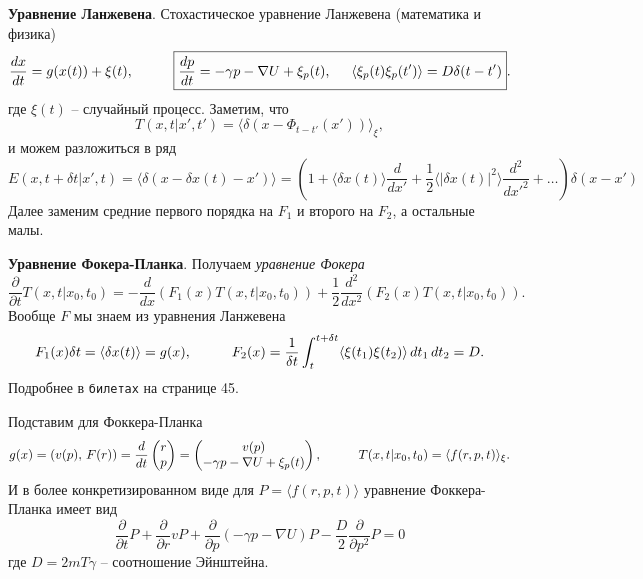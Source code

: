 \textbf{Уравнение Ланжевена}. Стохастическое уравнение Ланжевена (математика и физика)
\begin{equation}
	\frac{d x}{d t}  = g(x(t)) + \xi(t),
	\hspace{10 mm} 
	\boxed{
	\frac{d p}{d t} = -\gamma p - \nabla U + \xi_p(t),
	\hspace{5 mm} 
	\langle \xi_p (t) \xi_p (t')\rangle = D \delta(t-t')
	}.
\end{equation}
где $\xi(t)$ -- случайный процесс. Заметим, что
\begin{equation*}
	T(x, t|x',t') = \langle \delta(x-\Phi_{t-t'}(x'))\rangle_\xi,
\end{equation*}
и можем разложиться в ряд
\begin{equation*}
	E(x, t+ \delta t| x' , t) = \langle \delta(x-\delta x(t)-x')\rangle 
	= \left(
		1 + \langle \delta x(t)\rangle \frac{d }{d x'} + \frac{1}{2} \langle |\delta x(t)|^2\rangle \frac{d^2}{d {x'}^2}  + \ldots
	\right) \delta(x-x')
\end{equation*}
Далее заменим средние первого порядка на $F_1$ и второго на $F_2$, а остальные малы.

\textbf{Уравнение Фокера-Планка}. Получаем \textit{уравнение Фокера}
\begin{equation*}
	\frac{\partial }{\partial t} T(x, t|x_0, t_0) = - \frac{d }{d x} \left(
		F_1(x) T(x, t|x_0, t_0)
	\right) + \frac{1}{2} \frac{d^2}{d x^2} \left(
		F_2(x) T(x, t|x_0, t_0)
	\right).
\end{equation*}
Вообще $F$ мы знаем из уравнения Ланжевена
\begin{equation*}
	F_1(x) \delta t = \langle \delta x(t)\rangle = g(x),
	\hspace{10 mm} 
	F_2(x) = \frac{1}{\delta t} \int_{t}^{t+\delta t} \langle \xi(t_1) \xi(t_2)\rangle \d t_1 \d t_2 = D.
\end{equation*}
Подробнее в \texttt{билетах} на странице 45.


Подставим для Фоккера-Планка
\begin{equation*}
	g(x) = (v(p),\, F(r)) = 
	\frac{d }{d t} \begin{pmatrix}
		r \\ p
	\end{pmatrix} = \begin{pmatrix}
		v(p) \\ - \gamma p - \nabla U + \xi_p(t)
	\end{pmatrix},
	\hspace{10 mm} 
	T(x, t|x_0,t_0) = \langle f(r,p, t)\rangle_\xi.
\end{equation*}
И в более конкретизированном виде для $P = \langle f(r, p, t)\rangle$ уравнение Фоккера-Планка имеет вид
\begin{equation}
\boxed{
	\frac{\partial }{\partial t}P + \frac{\partial }{\partial r} vP+ \frac{\partial}{\partial p}  (-\gamma p - \nabla U) P - \frac{D}{2} \frac{\partial }{\partial p^2} P = 0
}
\end{equation}
где $D=2m T \gamma$ -- соотношение Эйнштейна. 




